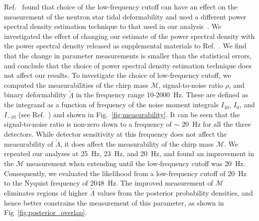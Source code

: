 Ref.~\cite{Abbott:2018wiz} found that choice of the low-frequency cutoff can have an effect on the measurement of the neutron star tidal deformability and used a different power spectral density estimation technique to that used in our analysis~\cite{Littenberg:2014oda}. We investigated the effect of changing our estimate of the power spectral density with the power spectral density released as supplemental materials to Ref.~\cite{Abbott:2018wiz}. We find that the change in parameter measurements is smaller than the statistical errors, and conclude that the choice of power spectral density estimation technique does not affect our results. To investigate the choice of low-frequency cutoff, we computed the measurabilities of the chirp mass $\mathcal{M}$, signal-to-noise ratio $\rho$, and binary deformability $\tilde{\Lambda}$ in the frequency range 10-2000~Hz. These are defined as the integrand as a function of frequency of the noise moment integrals $I_{\mathrm 10}$, $I_{\mathrm 0}$, and $I_{\mathrm -10}$ (see Ref.~\cite{Damour:2012yf}) and shown in Fig.~\ref{fig:measurability}. It can be seen that the signal-to-noise ratio is non-zero down to a frequency of $\sim$ 20~Hz for all the three detectors. While detector sensitivity at this frequency does not affect the measurability of $\tilde\Lambda$, it does affect the measurability of the chirp mass $\mathcal{M}$. We repeated our analyses at 25~Hz, 23~Hz, and 20~Hz, and found an improvement in the $\mathcal{M}$ measurement when extending until the low-frequency cutoff was 20~Hz. Consequently, we evaluated the likelihood from a low-frequency cutoff of 20~Hz to the Nyquist frequency of 2048~Hz. The improved measurement of $\mathcal{M}$ eliminates regions of higher $\tilde{\Lambda}$ values from the posterior probability densities, and hence better constrains the measurement of this parameter, as shown in Fig~\ref{fig:posterior_overlap}.

